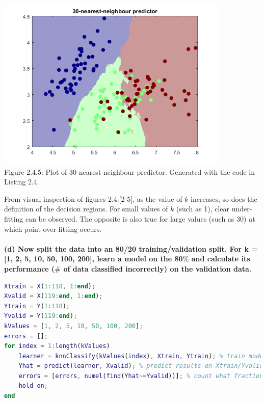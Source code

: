 \documentclass[]{report}   %
\begin{document}
\begin{center}
	\includegraphics[width=30em,keepaspectratio]{2_4_Figure_5.png}\\
	{Figure 2.4.5: Plot of 30-nearest-neighbour predictor. Generated with the code in Listing 2.4.}
\end{center} 
{From visual inspection of figures 2.4.[2-5], as the value of $k$ increases, so does the definition of the decision regions. For small values of $k$ (such as 1), clear under-fitting can be observed. The opposite is also true for large values (such as 30) at which point over-fitting occurs.}
\\~\\
{\bf (d) Now split the data into an 80/20 training/validation split. For k = [1, 2, 5, 10, 50, 100, 200], learn a model on the 80$\%$ and calculate its performance ($\#$ of data classified incorrectly) on the validation data.}
\begin{lstlisting}[language=Matlab, caption=Training models on 80\% training data and calculating its performance on 20\% validation data.]
Xtrain = X(1:118, 1:end);
Xvalid = X(119:end, 1:end);
Ytrain = Y(1:118);
Yvalid = Y(119:end);
kValues = [1, 2, 5, 10, 50, 100, 200];
errors = [];
for index = 1:length(kValues)
    learner = knnClassify(kValues(index), Xtrain, Ytrain); % train model on X/Ytrain
    Yhat = predict(learner, Xvalid); % predict results on Xtrain/Yvalid
    errors = [errors, numel(find(Yhat~=Yvalid))]; % count what fraction of predictions are wrong   
    hold on;
end
\end{lstlisting}
\end{document}
